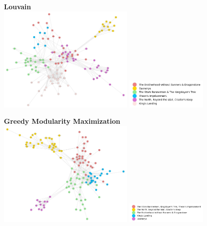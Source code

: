 \documentclass[10pt,twocolumn,letterpaper]{article}
\begin{document}
\begin{center}
    \textbf{Louvain} \\
    \includegraphics[width=0.5\textwidth]{img/s3/communities_louvain.jpg}
    \includegraphics[width=0.3\textwidth]{img/s3/louvain_legend.jpg}\\
    \caption{\small{$\#communities=6$, $modularity=0.626$}}
\end{center}



\begin{center}
    \textbf{Greedy Modularity Maximization}\\
    \includegraphics[width=0.5\textwidth]{img/s3/communities_gmm.jpg}
    \includegraphics[width=0.3\textwidth]{img/s3/gmm_legend.jpg}\\
    \caption{\small{$\#communities=5$, $modularity=0.581$}}
\end{center}
\end{document}

